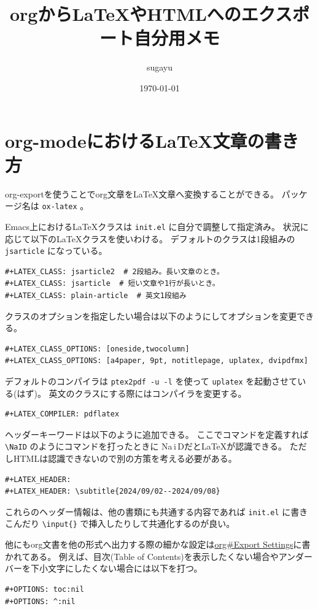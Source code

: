 \documentclass[a4paper, 10pt, notitlepage, uplatex, dvipdfmx]{jsarticle}
\author{sugayu}
\date{\today}
\title{\textbf{orgから\LaTeX{}やHTMLへのエクスポート自分用メモ}}
\newcommand{\NaID}{\mbox{Na\,{\sc i}\,D}}
\begin{document}
\maketitle
\section{org-modeにおける\LaTeX{}文章の書き方}
\label{sec:org5c59a17}
org-exportを使うことでorg文章を\LaTeX{}文章へ変換することができる。
パッケージ名は \texttt{ox-latex} 。

Emacs上における\LaTeX{}クラスは \texttt{init.el} に自分で調整して指定済み。
状況に応じて以下の\LaTeX{}クラスを使いわける。
デフォルトのクラスは1段組みの \texttt{jsarticle} になっている。

\begin{verbatim}
#+LATEX_CLASS: jsarticle2  # 2段組み。長い文章のとき。
#+LATEX_CLASS: jsarticle  # 短い文章や1行が長いとき。
#+LATEX_CLASS: plain-article  # 英文1段組み
\end{verbatim}
クラスのオプションを指定したい場合は以下のようにしてオプションを変更できる。
\begin{verbatim}
#+LATEX_CLASS_OPTIONS: [oneside,twocolumn]
#+LATEX_CLASS_OPTIONS: [a4paper, 9pt, notitlepage, uplatex, dvipdfmx]
\end{verbatim}
デフォルトのコンパイラは \texttt{ptex2pdf -u -l} を使って \texttt{uplatex} を起動させている(はず)。
英文のクラスにする際にはコンパイラを変更する。
\begin{verbatim}
#+LATEX_COMPILER: pdflatex
\end{verbatim}
ヘッダーキーワードは以下のように追加できる。
ここでコマンドを定義すれば \texttt{\textbackslash{}NaID} のようにコマンドを打ったときに \NaID だと\LaTeX{}が認識できる。
ただしHTMLは認識できないので別の方策を考える必要がある。
\begin{verbatim}
#+LATEX_HEADER: 
#+LATEX_HEADER: \subtitle{2024/09/02--2024/09/08}
\end{verbatim}
これらのヘッダー情報は、他の書類にも共通する内容であれば \texttt{init.el} に書きこんだり \texttt{\textbackslash{}input\{\}} で挿入したりして共通化するのが良い。

他にもorg文書を他の形式へ出力する際の細かな設定は\href{info:org\#Export Settings}{org\#Export Settings}に書かれてある。
例えば、目次(Table of Contents)を表示したくない場合やアンダーバーを下小文字にしたくない場合には以下を打つ。
\begin{verbatim}
#+OPTIONS: toc:nil
#+OPTIONS: ^:nil
\end{verbatim}
\end{document}
